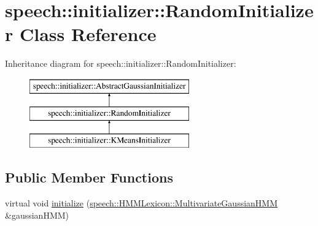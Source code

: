 \hypertarget{classspeech_1_1initializer_1_1RandomInitializer}{\section{speech\+:\+:initializer\+:\+:Random\+Initializer Class Reference}
\label{classspeech_1_1initializer_1_1RandomInitializer}
}
Inheritance diagram for speech\+:\+:initializer\+:\+:Random\+Initializer\+:\begin{figure}[H]
\begin{center}
\leavevmode
\includegraphics[height=3.000000cm]{classspeech_1_1initializer_1_1RandomInitializer}
\end{center}
\end{figure}
\subsection*{Public Member Functions}
\begin{DoxyCompactItemize}
\item 
virtual void \hyperlink{classspeech_1_1initializer_1_1RandomInitializer_a62c031971e30c4c99516a20268511963}{initialize} (\hyperlink{classspeech_1_1HMMLexicon_1_1MultivariateGaussianHMM}{speech\+::\+H\+M\+M\+Lexicon\+::\+Multivariate\+Gaussian\+H\+M\+M} \&gaussian\+H\+M\+M)
\end{DoxyCompactItemize}
